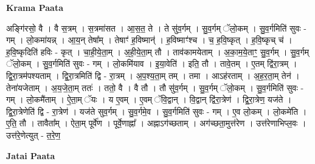 \documentclass[17pt]{extarticle}
\begin{document}
\textbf{Krama Paata} \newline

अङ्‍गि॑रसो॒ वै । वै स॒त्रम् । स॒त्रमा॑सत । आ॒स॒त॒ ते । ते सु॑व॒र्गम् । सु॒व॒र्गम् ॅलो॒कम् । सु॒व॒र्गमिति॑ सुवः - गम् । लो॒कमा॑यन्न् । आ॒य॒न् तेषा᳚म् । तेषाꣳ॑ ह॒विष्मान्॑ । ह॒विष्माꣳ॑श्च । च॒ ह॒वि॒ष्कृत् । 
ह॒वि॒ष्कृच् च॑ । ह॒वि॒ष्कृदिति॑ हविः - कृत् । चा॒ही॒ये॒ता॒म् । अ॒ही॒ये॒ता॒म् तौ । ताव॑कामयेताम् । अ॒का॒म॒ये॒ताꣳ॒॒ सु॒व॒र्गम् । सु॒व॒र्गम् ॅलो॒कम् । सु॒व॒र्गमिति॑ सुवः - गम् । लो॒कमि॑याव । इ॒या॒वेति॑ । इति॒ तौ । तावे॒तम् । ए॒तम् द्वि॑रा॒त्रम् । द्वि॒रा॒त्रम॑पश्यताम् । द्वि॒रा॒त्रमिति॑ द्वि - रा॒त्रम् । अ॒प॒श्य॒ता॒म् तम् । तमा । आऽह॑रताम् । अ॒ह॒र॒ता॒म् तेन॑ । तेना॑यजेताम् । अ॒य॒जे॒ता॒म् ततः॑ । ततो॒ वै । वै तौ । तौ सु॑व॒र्गम् । सु॒व॒र्गम् ॅलो॒कम् । सु॒व॒र्गमिति॑ सुवः - गम् । लो॒कमै॑ताम् । ऐ॒ता॒म् ॅयः । य ए॒वम् । ए॒वम् ॅवि॒द्वान् । वि॒द्वान् द्वि॑रा॒त्रेण॑ । द्वि॒रा॒त्रेण॒ यज॑ते । द्वि॒रा॒त्रेणेति॑ द्वि - रा॒त्रेण॑ । यज॑ते सुव॒र्गम् । सु॒व॒र्गमे॒व । सु॒व॒र्गमिति॑ सुवः - गम् । ए॒व लो॒कम् । लो॒कमे॑ति । ए॒ति॒ तौ । तावैता᳚म् । ऐता॒म् पूर्वे॑ण । पूर्वे॒णाह्ना᳚ । अह्नाऽग॑च्छताम् । अग॑च्छता॒मुत्त॑रेण । उत्त॑रेणाभिप्ल॒वः । उत्त॑रे॒णेत्युत् - त॒रे॒ण॒ \newline

\textbf{Jatai Paata} \newline
\end{document}
